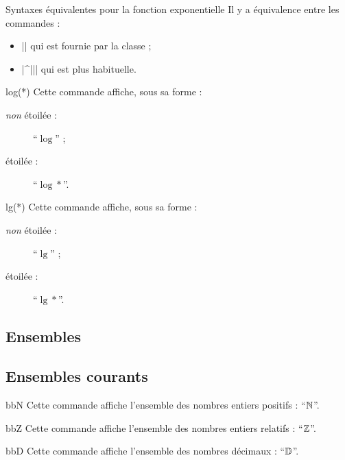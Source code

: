 \documentclass[french,nolocaltoc]{nwejmart}
\newtheorem[title=Fait,style=definition]{fact}
\begin{document}
\begin{dbremark}{Syntaxes équivalentes pour la fonction exponentielle}{}
  Il y a équivalence entre les commandes :
  \begin{itemize}
  \item || qui est fournie par la classe ;
  \item |\E^{||}| qui est plus habituelle.
\end{itemize}
\end{dbremark}

\begin{docCommand}{log(*)}{}
  Cette commande affiche, sous sa forme :
  \begin{description}
  \item[\emph{non} étoilée :] \enquote{$\log$} ;
  \item[étoilée :] \enquote{$\log*$}.
  \end{description}
\end{docCommand}

\begin{docCommand}{lg(*)}{}
  Cette commande affiche, sous sa forme :
  \begin{description}
  \item[\emph{non} étoilée :] \enquote{$\lg$} ;
  \item[étoilée :] \enquote{$\lg*$}.
  \end{description}
\end{docCommand}

\subsection{Ensembles}

\subsection{Ensembles courants}

\begin{docCommand}{bbN}{}
  Cette commande affiche l'ensemble des nombres entiers positifs :
  \enquote{$\mathbb{N}$}.
\end{docCommand}

\begin{docCommand}{bbZ}{}
  Cette commande affiche l'ensemble des nombres entiers relatifs :
  \enquote{$\mathbb{Z}$}.
\end{docCommand}

\begin{docCommand}{bbD}{}
  Cette commande affiche l'ensemble des nombres décimaux : \enquote{$\mathbb{D}$}.
\end{docCommand}
\end{document}
